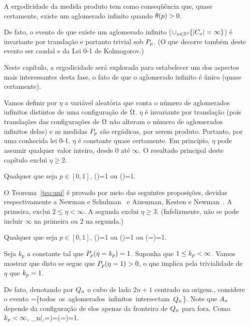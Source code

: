 A ergodicidade da medida produto
tem como conseqüência que, quase certamente, existe um aglomerado infinito quando
$\theta(p)>0$. 

De fato, o evento de que existe um aglomerado infinito
($\cup_{x\in\mathbb{Z}^d}\{|C_x|=\infty\}$) é invariante por translação e portanto
trivial sob $P_p$. (O que decorre também deste evento ser caudal e da Lei
0-1 de Kolmogorov.)

Neste capítulo, a ergodicidade será 
explorada para estabelecer um dos aspectos mais interessantes desta fase, o fato de que
o aglomerado infinito é único (quase certamente).

Vamos definir por $\eta$ a variável aleatória que conta o número de aglomerados infinitos distintos
de uma configuração de $\Omega$.  
$\eta$ é invariante por translação (pois translações das configurações de $\Omega$ não alteram 
o número de aglomerados infinitos delas) e as medidas $P_p$ são ergódicas, por serem  
produto. Portanto, por uma conhecida lei 0-1, $\eta$ é constante quase certamente. Em 
princípio,
$\eta$ pode assumir qualquer valor inteiro, desde $0$ até $\infty$.
O  resultado principal deste capítulo exclui $\eta\geq2$.

\vs

\bte
\label{teo:uni}
Qualquer que seja $p\in[0,1]$,
\beq
\p()=1
\eeq
ou
\beq
\p()=1.
\eeq
\ete

\vs

O Teorema~\ref{teo:uni} é provado por meio das seguintes proposições, devidas
respectivamente
a Newman e Schulman~\cite{kn:NS} e Aizenman, Kesten e 
Newman~\cite{kn:AKN}. A primeira, exclui $2\leq\eta<\infty$.  
A segunda exclui $\eta\geq3$. (Infelizmente, não se pode
incluir $\infty$ na primeira ou $2$ na segunda.)

\vs

\bpro
\label{prop:uni1}
Qualquer que seja $p\in[0,1]$,
\beq
\p()=1
\eeq
ou
\beq
\p()=1
\eeq
ou
\beq
\p(\eta=\infty)=1.
\eeq
\epro

\vs


Seja $k_p$ a constante tal que $P_p(\eta=k_p)=1$. Suponha que $1\leq k_p<\infty$. Vamos 
mostrar que disto se segue que $P_p(\eta=1)>0$, o que implica pela trivialidade de $\eta$ que $k_p=1$.

De fato, denotando por $Q_n$ o cubo de lado $2n+1$ centrado na origem., considere o 
evento 
\beq
\an=\{\mbox{todos os aglomerados infinitos intersectam $\qn$}\}.
\eeq
Note que $A_n$ depende da configuração de elos apenas da fronteira de $Q_n$ para fora.
Como $k_p<\infty$,  
\beq
\lim_{n\to\infty}\p(\an,\eta=\kp)=\p(\eta=\kp)=1.
\eeq


